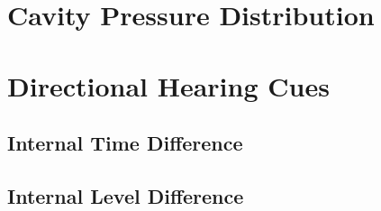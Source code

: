 \section{Cavity Pressure Distribution}

\section{Directional Hearing Cues}

\subsection{Internal Time Difference}

\subsection{Internal Level Difference}